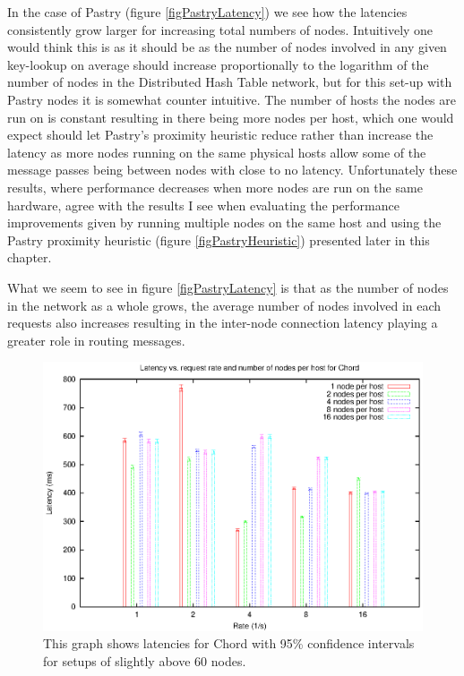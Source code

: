 In the case of Pastry (figure \ref{figPastryLatency}) we see how the latencies consistently grow larger for increasing total numbers of nodes. Intuitively one would think this is as it should be as the number of nodes involved in any given key-lookup on average should increase proportionally to the logarithm of the number of nodes in the Distributed Hash Table network, but for this set-up with Pastry nodes it is somewhat counter intuitive. The number of hosts the nodes are run on is constant resulting in there being more nodes per host, which one would expect should let Pastry's proximity heuristic reduce rather than increase the latency as more nodes running on the same physical hosts allow some of the message passes being between nodes with close to no latency.
Unfortunately these results, where performance decreases when more nodes are run on the same hardware, agree with the results I see when evaluating the performance improvements given by running multiple nodes on the same host and using the Pastry proximity heuristic (figure \ref{figPastryHeuristic}) presented later in this chapter. 

What we seem to see in figure \ref{figPastryLatency} is that as the number of nodes in the network as a whole grows, the average number of nodes involved in each requests also increases resulting in the inter-node connection latency playing a greater role in routing messages.

\begin{figure}[!htbp]
  \begin{center}
    \includegraphics[width=0.9\linewidth]{illustrations/latency_chord.eps}
    \caption{This graph shows latencies for Chord with 95\% confidence intervals for setups of slightly above 60 nodes.}
    \label{figChordLatency}
  \end{center}
\end{figure}

